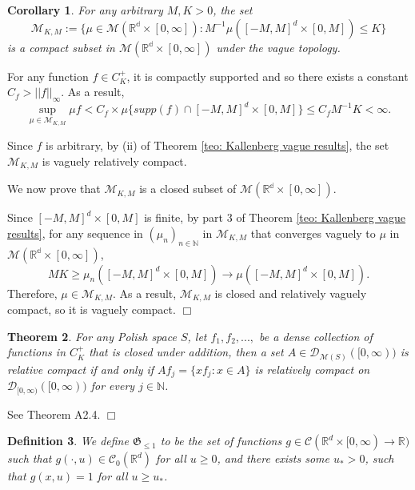 \documentclass[12pt]{article}
\newenvironment {proof}{{\noindent\bf Proof }}{\hfill $\Box$ \medskip}
\newtheorem{theorem}{Theorem}[section]
\newtheorem{corollary}[theorem]{Corollary}
\newtheorem{definition}[theorem]{Definition}
\begin{document}
\begin{corollary}
\label{cor: Vague Compact sets}
For any arbitrary $M,K>0$, the set 
$$\mathcal{M}_{K,M}:= \{\mu \in \mathcal{M}(\mathbb{R^d} \times [0, \infty]): M^{-1}\mu([-M,M]^d \times [0,M]) \leq K\}$$   
is a compact subset in 
$\mathcal{M}(\mathbb{R^d} \times [0, \infty])$ 
under the vague topology.
\end{corollary}
\begin{proof}
For any function $f \in C^{+}_K$, it is compactly supported and
so there exists a constant $C_f > ||f||_{\infty}$.
As a result, 
$$\sup_{\mu \in \mathcal{M}_{K,M}} \mu f < C_f \times \mu \{ supp(f) \cap [-M,M]^d \times [0,M]\} \leq C_f M^{-1} K < \infty.$$

Since $f$ is arbitrary, by (ii) of Theorem \ref{teo: Kallenberg vague results}, 
the set
$\mathcal{M}_{K,M}$
is vaguely relatively compact. 

We now prove that $\mathcal{M}_{K,M}$ is a closed subset of $\mathcal{M}(\mathbb{R^d} \times [0, \infty])$.

Since $[-M,M]^d \times [0,M]$ is finite, by part 3 of Theorem \ref{teo: Kallenberg vague results},
for any sequence in $(\mu_n)_{n \in \mathbb{N}}$ in  $\mathcal{M}_{K,M}$ that converges vaguely to $\mu$ in 
$ \mathcal{M}(\mathbb{R^d} \times [0, \infty])$, 
$$MK \geq \mu_n([-M,M]^d \times [0,M]) \to \mu([-M,M]^d \times [0,M]).$$
Therefore, $\mu \in \mathcal{M}_{K,M}$.
As a result, $\mathcal{M}_{K,M}$ is closed and relatively vaguely compact, so it is vaguely compact.
\end{proof}

\begin{theorem}
    \label{teo: Vague Relative Compactness through Projection}
For any Polish space $S$, let $f_1,f_2,...,$ be a dense collection of functions in $C^{+}_{K}$ that is closed under addition, then a set $A \in \mathcal{D}_{\mathcal{M}(S)}([0,\infty))$ is relative compact if and only if $Af_j = \{xf_j: x \in A\}$ is relatively compact on $\mathcal{D}_{[0, \infty)}([0,\infty))$ for every $j \in \mathbb{N}$.
\end{theorem}
\begin{proof}
See \cite{kallenberg1997foundations} Theorem A2.4.
\end{proof}
\begin{definition}
We define $\mathfrak{G}_{\leq 1}$ to be the set of functions $g \in \mathcal{C}(\mathbb{R}^d \times [0, \infty) \to \mathbb{R})$ such that 
$g(\cdot, u) \in \mathcal{C}_{0}(\mathbb{R}^d)$ for all $u \geq 0$, and there exists some $u_{*}>0$, such that $g(x,u)=1$ for all $u \geq u_{*}$.
\end{definition}
\end{document}
